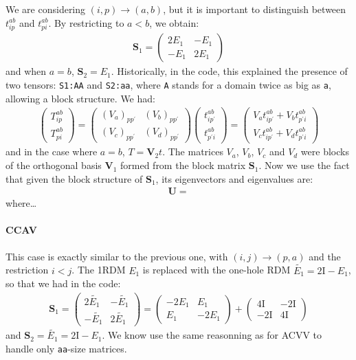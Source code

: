 \documentclass{article}
\newcommand  \equ[2]       {\begin{align}#2\label{#1}\end{align}}
\renewcommand\b[1]         {\mathbf{#1}}
\newcommand  \var[1]       {\texttt{#1}}
\renewcommand\P            {^\prime}
\begin{document}
We are considering $(i,p)\rightarrow(a,b)$, but it is important to distinguish between $t_{ip}^{ab}$ and $t_{pi}^{ab}$. By restricting to $a< b$, we obtain:
\equ{ }{
  \b{S}_1=\begin{pmatrix} 2 E_1 & -E_1 \\ -E_1 & 2 E_1 \end{pmatrix}
}
and when $a=b$, $\b{S}_2=E_1$. 
Historically, in the code, this explained the presence of two tensors: \var{S1:AA} and \var{S2:aa}, where \var{A} stands for a domain twice as big as \var{a}, allowing a block structure.
We had:
\equ{ }{
  \begin{pmatrix}T_{ip}^{ab}\\T_{pi}^{ab}\end{pmatrix}
  =
  \begin{pmatrix}
    (V_a)_{p p\P} & (V_b)_{p p\P}\\
    (V_c)_{p p\P} & (V_d)_{p p\P}
  \end{pmatrix}
  \begin{pmatrix}t_{ip\P}^{ab}\\t_{p\P i}^{ab}\end{pmatrix}
  =
  \begin{pmatrix}
    V_a t_{ip\P}^{ab} + V_b t_{p\P i}^{ab} \\
    V_c t_{ip\P}^{ab} + V_d t_{p\P i}^{ab}
  \end{pmatrix}
}
and in the case where $a=b$, $T=\b{V}_2 t$. The matrices $V_a$, $V_b$, $V_c$ and $V_d$ were blocks of the orthogonal basis $\b{V}_1$ formed from the block matrix $\b{S}_1$.
Now we use the fact that given the block structure of $\b{S}_1$, its eigenvectors and eigenvalues are: 
\equ{ }{
  \b{U}=
}
where\dots

\paragraph{CCAV}

This case is exactly similar to the previous one, with $(i,j)\rightarrow(p,a)$ and the restriction $i<j$. The 1RDM $E_1$ is replaced with the one-hole RDM $\tilde{E_1}=2\text{I} - E_1$, so that we had in the code:
\equ{ }{
  \b{S}_1=\begin{pmatrix} 2\tilde{E_1} & -\tilde{E_1}\\ -\tilde{E_1} & 2\tilde{E_1} \end{pmatrix}
         =\begin{pmatrix}-2 E_1   &   E_1    \\  E_1     & -2 E_1  \end{pmatrix}
         +\begin{pmatrix} 4\text{I} & -2\text{I} \\ -2\text{I} & 4\text{I} \end{pmatrix}
}
and $\b{S}_2=\tilde{E_1}=2\text{I}-E_1$.
We know use the same reasonning as for ACVV to handle only \var{aa}-size matrices.
\end{document}
